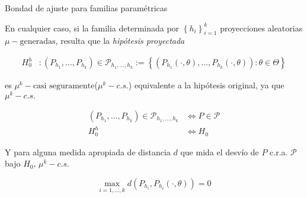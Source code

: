 \documentclass[10pt,spanish,handout]{beamer}\usepackage[]{graphicx}\usepackage[]{color}
\begin{document}
%
\begin{frame}{Bondad de ajuste para familias paramétricas}

En cualquier caso, si la familia determinada por $\left\{ h_{i}\right\} _{i=1}^{k}$
proyecciones aleatorias $\mu-\text{generadas}$, resulta que la \emph{hipótesis
proyectada}

\vspace{-15pt}

\begin{align*}
H_{0}^{h} & :\left(P_{h_{1}},\ldots,P_{h_{k}}\right)\in\mathcal{P}_{h_{1},\ldots,h_{k}}:=\left\{ \left(P_{h_{1}}(\cdot,\theta),\ldots,P_{h_{k}}(\cdot,\theta)\right):\theta\in\Theta\right\} 
\end{align*}


\pause{}

es $\mu^{k}-\text{casi seguramente}$($\mu^{k}-c.s.$) equivalente
a la hipótesis original, ya que $\mu^{k}-c.s.$

\vspace{-15pt}

\begin{align*}
\left(P_{h_{1}},\ldots,P_{h_{k}}\right)\in\mathcal{P}_{h_{1},\ldots,h_{k}} & \iff P\in\mathcal{P}\\
H_{0}^{h} & \iff H_{0}
\end{align*}


\pause{}

Y para alguna medida apropiada de distancia $d$ que mida el desvío
de $P$ c.r.a. $\mathcal{P}$ bajo $H_{0}$, $\mu^{k}-c.s.$

\vspace{-15pt}

\[
\max_{i=1,\ldots,k}d\left(P_{h_{i}},P_{h_{i}}(\cdot,\theta)\right)=0
\]

\end{frame}
%
\end{document}
